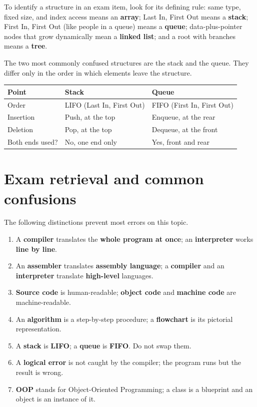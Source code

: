 \documentclass[11pt]{article}
\begin{document}
To identify a structure in an exam item, look for its defining rule: same type,
fixed size, and index access means an \textbf{array}; Last In, First Out means
a \textbf{stack}; First In, First Out (like people in a queue) means a
\textbf{queue}; data-plus-pointer nodes that grow dynamically mean a
\textbf{linked list}; and a root with branches means a \textbf{tree}.

The two most commonly confused structures are the stack and the queue. They
differ only in the order in which elements leave the structure.

\begin{center}
\begin{tabular}{p{}p{}p{}}
\toprule
\textbf{Point} & \textbf{Stack} & \textbf{Queue} \\
\midrule
Order & LIFO (Last In, First Out) & FIFO (First In, First Out) \\
Insertion & Push, at the top & Enqueue, at the rear \\
Deletion & Pop, at the top & Dequeue, at the front \\
Both ends used? & No, one end only & Yes, front and rear \\
\bottomrule
\end{tabular}
\end{center}

\section{Exam retrieval and common confusions}
The following distinctions prevent most errors on this topic.
\begin{enumerate}
  \item A \textbf{compiler} translates the \textbf{whole program at once}; an
    \textbf{interpreter} works \textbf{line by line}.
  \item An \textbf{assembler} translates \textbf{assembly language}; a
    \textbf{compiler} and an \textbf{interpreter} translate
    \textbf{high-level} languages.
  \item \textbf{Source code} is human-readable; \textbf{object code} and
    \textbf{machine code} are machine-readable.
  \item An \textbf{algorithm} is a step-by-step procedure; a
    \textbf{flowchart} is its pictorial representation.
  \item A \textbf{stack} is \textbf{LIFO}; a \textbf{queue} is
    \textbf{FIFO}. Do not swap them.
  \item A \textbf{logical error} is not caught by the compiler; the program
    runs but the result is wrong.
  \item \textbf{OOP} stands for Object-Oriented Programming; a class is a
    blueprint and an object is an instance of it.
\end{enumerate}
\end{document}
